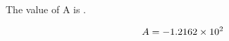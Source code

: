 \documentclass{article}
\begin{document}
The value of A is \incA.

\begin{equation}
  A = \SI{-1.2162e+02}{}
\end{equation}
\end{document}
